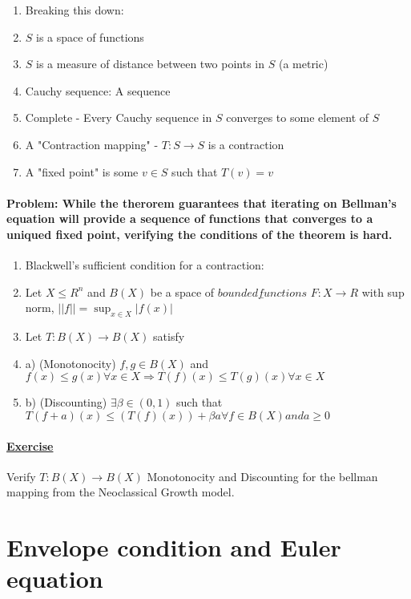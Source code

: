 \documentclass{article}
\begin{document}
\begin{enumerate}
    \item Breaking this down:
    \item $S$ is a space of functions
    \item $S$ is a measure of distance between two points in $S$ (a metric)
    \item Cauchy sequence: A sequence 
    \item Complete - Every Cauchy sequence in $S$ converges to some element of $S$
    \item A "Contraction mapping" - $T : S \rightarrow S$ is a contraction 
    \item A "fixed point" is some $v \in S$ such that $T(v) = v$
    
\end{enumerate}

\paragraph{Problem: While the therorem guarantees that iterating
on Bellman's equation will provide a sequence of functions that converges
to a uniqued fixed point, verifying the conditions of the theorem is hard.}

\begin{enumerate}
    \item Blackwell's sufficient condition for a contraction:
    \item Let $X \leq R^n$ and $B(X)$ be a space of $\underline{bounded functions}$ 
    $F: X \rightarrow R$ with sup norm, $||f|| = \sup_{x \in X} |f(x)|$
    \item Let $T: B(X) \rightarrow B(X)$ satisfy
    \item a) (Monotonocity) $f,g \in B(X)$ and $f(x) \leq g(x) \forall x \in X \Rightarrow T(f)(x) \leq T(g)(x) \forall x \in X$
    \item b) (Discounting) $\exists \beta \in (0,1)$ such that $T(f+a)(x) \leq (T(f)(x))+\beta a \forall f \in B(X) and a \geq 0$
\end{enumerate}

\paragraph[exercise]{\underline{Exercise}}
{Verify $T: B(X) \rightarrow B(X)$ Monotonocity and Discounting
for the bellman mapping from the Neoclassical Growth model.}

\section{Envelope condition and Euler equation}
\end{document}
